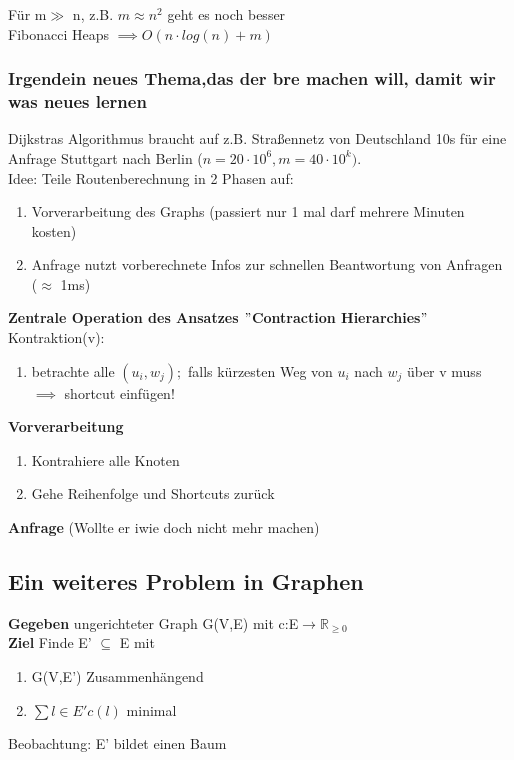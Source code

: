 \documentclass{article}
\begin{document}
\begin{enumerate}[label=\Alph*)]
Für m$\gg $ n, z.B. $m\approx n^2$ geht es noch besser \\
Fibonacci Heaps $\implies O(n \cdot log(n)+m)$
\end{enumerate}

\subsubsection{Irgendein neues Thema,das der bre machen will, damit wir was neues lernen}
Dijkstras Algorithmus braucht auf z.B. Straßennetz von Deutschland 10s für eine Anfrage Stuttgart nach Berlin ($n=20 \cdot 10^6, m=40 \cdot 10^k)$.\\
Idee: Teile Routenberechnung in 2 Phasen auf: 
\begin{enumerate}
  \item Vorverarbeitung des Graphs (passiert nur 1 mal darf mehrere Minuten kosten)
  \item Anfrage nutzt vorberechnete Infos zur schnellen Beantwortung von Anfragen ($\approx $ 1ms)
\end{enumerate}

\textbf{Zentrale Operation des Ansatzes $"$Contraction Hierarchies$"$}\\
Kontraktion(v):
\begin{enumerate}
  \item betrachte alle $(u_i,w_j);$ falls kürzesten Weg von $u_i$ nach $w_j$ über v muss $\implies$ shortcut einfügen!
\end{enumerate}

\textbf{Vorverarbeitung}
\begin{enumerate}
  \item Kontrahiere alle Knoten
  \item Gehe Reihenfolge und Shortcuts zurück
\end{enumerate}

\textbf{Anfrage} (Wollte er iwie doch nicht mehr machen)

\subsection{Ein weiteres Problem in Graphen}
\textbf{Gegeben} ungerichteter Graph G(V,E) mit c:E$\rightarrow \mathbb{R}_{\geq 0}$\\
\textbf{Ziel} Finde E' $\subseteq$ E mit
\begin{enumerate}
  \item G(V,E') Zusammenhängend
  \item $\sum{l \in E'}c(l)$ minimal
\end{enumerate}
Beobachtung: E' bildet einen Baum\\
\end{document}
